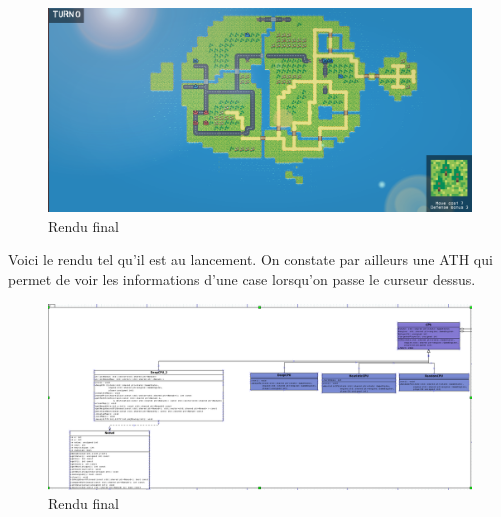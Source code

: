 \begin{figure}[h]
    \centering
    \includegraphics[scale =0.45]{images/rendufinal.png}
    \caption{Rendu final}
    \label{fig:Advance Wars}
\end{figure}

\newline
Voici le rendu tel qu'il est au lancement. On constate par ailleurs une ATH qui permet de voir les informations d'une case lorsqu'on passe le curseur dessus.

\newline


\begin{figure}[h]
    \centering
    \includegraphics[scale =0.25]{images/ia.png}
    \caption{Rendu final}
    \label{fig:Advance Wars}
\end{figure}

